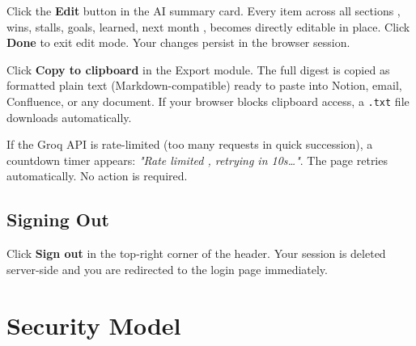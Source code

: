 \documentclass[12pt,a4paper]{article}
\begin{document}
\begin{tcolorbox}[step, title=\textbf{Editing content}, fonttitle=\small\bfseries\color{teal}]
Click the \textbf{Edit} button in the AI summary card. Every item across all sections , wins, stalls, goals, learned, next month , becomes directly editable in place. Click \textbf{Done} to exit edit mode. Your changes persist in the browser session.
\end{tcolorbox}

\begin{tcolorbox}[step, title=\textbf{Exporting your digest}, fonttitle=\small\bfseries\color{teal}]
Click \textbf{Copy to clipboard} in the Export module. The full digest is copied as formatted plain text (Markdown-compatible) ready to paste into Notion, email, Confluence, or any document. If your browser blocks clipboard access, a \texttt{.txt} file downloads automatically.
\end{tcolorbox}

\begin{tcolorbox}[step, title=\textbf{Rate limiting}, fonttitle=\small\bfseries\color{teal}]
If the Groq API is rate-limited (too many requests in quick succession), a countdown timer appears: \textit{"Rate limited , retrying in 10s…"}. The page retries automatically. No action is required.
\end{tcolorbox}

\subsection{Signing Out}

Click \textbf{Sign out} in the top-right corner of the header. Your session is deleted server-side and you are redirected to the login page immediately.

\section{Security Model}
\end{document}
